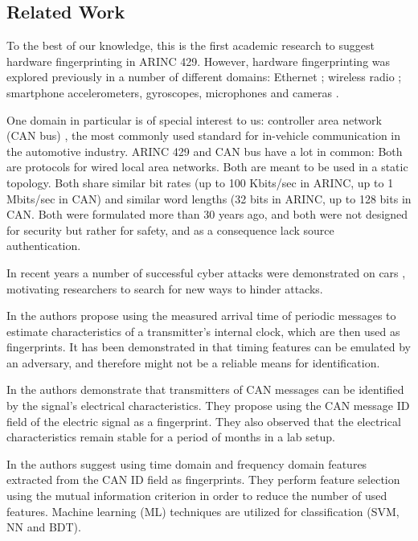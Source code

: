 \documentclass[compsoc,conference,a4paper]{IEEEtran}
\newcommand{\sublevel}[1]{\subsection{#1}}
\newcommand{\sublevel}[1]{\section{#1}}
\begin{document}
\sublevel{Related Work} \label{RelatedWork}
  To the best of our knowledge, this is the first academic research to suggest hardware fingerprinting in ARINC 429. However, hardware fingerprinting was explored previously in a number of different domains: Ethernet \cite{kohno2005remote, uluagac2013passive, gerdes2012physical}; wireless radio \cite{ellis2001characteristics, brik2008wireless, xu2015device}; smartphone accelerometers, gyroscopes, microphones and cameras \cite{dey2014accelprint, das2016tracking}.
  
  One domain in particular is of special interest to us: controller area network (CAN bus) \cite{bosch1991canbus}, the most commonly used standard for in-vehicle communication in the automotive industry. ARINC 429 and CAN bus have a lot in common: Both are protocols for wired local area networks. Both are meant to be used in a static topology. Both share similar bit rates (up to 100 Kbits/sec in ARINC, up to 1 Mbits/sec in CAN) and similar word lengths (32 bits in ARINC, up to 128 bits in CAN. Both were formulated more than 30 years ago, and both were not designed for security but rather for safety, and as a consequence lack source authentication.
  
  In recent years a number of successful cyber attacks were demonstrated on cars \cite{miller2015remote}, motivating researchers to search for new ways to hinder attacks.
  
  
  In \cite{cho2016fingerprinting} the authors propose using the measured arrival time of periodic messages to estimate characteristics of a transmitter's internal clock, which are then used as fingerprints. It has been demonstrated in \cite{sagong2018cloaking} that timing features can be emulated by an adversary, and therefore might not be a reliable means for identification.
  
  In \cite{murvay2014source} the authors demonstrate that transmitters of CAN messages can be identified by the signal's electrical characteristics. They propose using the CAN message ID field of the electric signal as a fingerprint. They also observed that the electrical characteristics remain stable for a period of months in a lab setup.
  
  In \cite{choi2018identifying} the authors suggest using time domain and frequency domain features extracted from the CAN ID field as fingerprints. They perform feature selection using the mutual information criterion in order to reduce the number of used features. Machine learning (ML) techniques are utilized for classification (SVM, NN and BDT).
  
\end{document}
